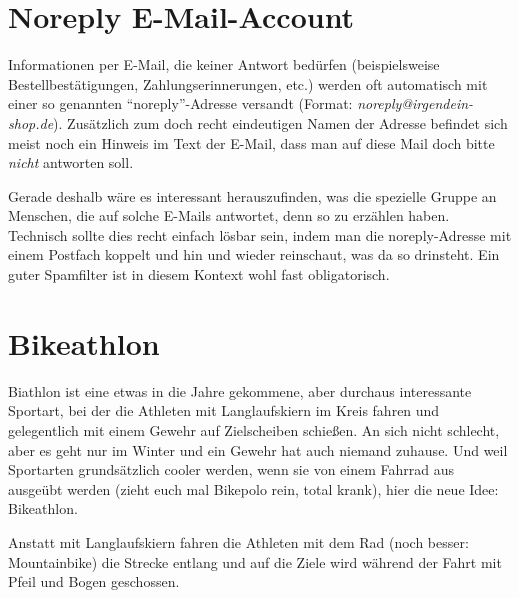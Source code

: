 \documentclass[a5paper,pagesize,10pt,bibtotoc,pointlessnumbers,normalheadings,DIV=9,twoside=false]{scrbook}
\begin{document}


\chapter{Noreply E-Mail-Account}

Informationen per E-Mail, die keiner Antwort bedürfen (beispielsweise Bestellbestätigungen, Zahlungserinnerungen, etc.) werden oft automatisch mit einer so genannten ``noreply''-Adresse versandt (Format: \emph{noreply@irgendein-shop.de}).
Zusätzlich zum doch recht eindeutigen Namen der Adresse befindet sich meist noch ein Hinweis im Text der E-Mail, dass man auf diese Mail doch bitte \emph{nicht} antworten soll.

Gerade deshalb wäre es interessant herauszufinden, was die spezielle Gruppe an Menschen, die auf solche E-Mails antwortet, denn so zu erzählen haben.
Technisch sollte dies recht einfach lösbar sein, indem man die noreply-Adresse mit einem Postfach koppelt und hin und wieder reinschaut, was da so drinsteht.
Ein guter Spamfilter ist in diesem Kontext wohl fast obligatorisch. 

\chapter{Bikeathlon}

Biathlon ist eine etwas in die Jahre gekommene, aber durchaus interessante Sportart, bei der die Athleten mit Langlaufskiern im Kreis fahren und gelegentlich mit einem Gewehr auf Zielscheiben schießen.
An sich nicht schlecht, aber es geht nur im Winter und ein Gewehr hat auch niemand zuhause.
Und weil Sportarten grundsätzlich cooler werden, wenn sie von einem Fahrrad aus ausgeübt werden (zieht euch mal Bikepolo rein, total krank), hier die neue Idee: Bikeathlon.

Anstatt mit Langlaufskiern fahren die Athleten mit dem Rad (noch besser: Mountainbike) die Strecke entlang und auf die Ziele wird während der Fahrt mit Pfeil und Bogen geschossen.

\end{document}
